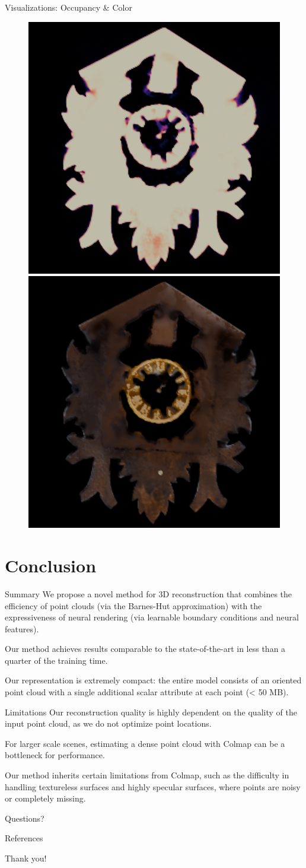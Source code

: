 \documentclass[10pt]{beamer}
\begin{document}
\begin{frame}{Visualizations: Occupancy \& Color}
\begin{figure}
        \includegraphics[width=0.3\linewidth]{figures/results/clock_occu.png}
        \includegraphics[width=0.3\linewidth]{figures/results/clock_color.png}
    \end{figure}
\end{frame}

\section{Conclusion}

\begin{frame}{Summary}
    We propose a novel method for 3D reconstruction that combines the \alert{efficiency} of point clouds (via the Barnes-Hut approximation) with the \alert{expressiveness} of neural rendering (via learnable boundary conditions and neural features).

    Our method achieves results comparable to the state-of-the-art in less than a quarter of the training time.

    Our representation is extremely \alert{compact}: the entire model consists of an oriented point cloud with a single additional scalar attribute at each point (< 50 MB).
\end{frame}

\begin{frame}{Limitations}
    Our reconstruction quality is highly dependent on the quality of the input point cloud, as we do not optimize point locations.

    For larger scale scenes, estimating a dense point cloud with Colmap can be a bottleneck for performance.

    Our method inherits certain limitations from Colmap, such as the difficulty in handling textureless surfaces and highly specular surfaces, where points are noisy or completely missing.
\end{frame}

\begin{frame}[standout]
    Questions?
\end{frame}

\begin{frame}[allowframebreaks]{References}
    \renewcommand{\bibsection}{}
    
    
\end{frame}

\begin{frame}[standout]
    Thank you!
\end{frame}
\end{document}
